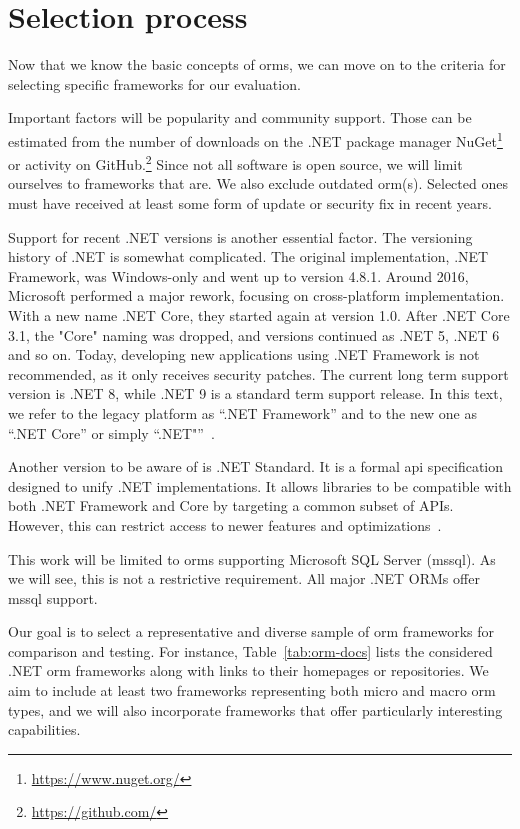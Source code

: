 \section{Selection process}
Now that we know the basic concepts of \acrshort{orm}s, we can move on to the criteria for selecting specific frameworks for our evaluation.

Important factors will be popularity and community support. Those can be estimated from the number of downloads on the .NET package manager NuGet\footnote{\url{https://www.nuget.org/}} or activity on GitHub.\footnote{\url{https://github.com/}} Since not all software is open source, we will limit ourselves to frameworks that are. We also  exclude outdated \acrshort{orm}(s). Selected ones must have received at least some form of update or security fix in recent years.

Support for recent .NET versions is another essential factor. The versioning history of .NET is somewhat complicated. The original implementation, .NET Framework, was Windows-only and went up to version 4.8.1. Around 2016, Microsoft performed a major rework, focusing on cross-platform implementation. With a new name .NET Core, they started again at version 1.0. After .NET Core 3.1, the "Core" naming was dropped, and versions continued as .NET 5, .NET 6 and so on. Today, developing new applications using .NET Framework is not recommended, as it only receives security patches. The current long term support version is .NET 8, while .NET 9 is a standard term support release. In this text, we refer to the legacy platform as ``.NET Framework'' and to the new one as ``.NET Core'' or simply ``.NET"''~\cite{NETFrameworkVersions,NETversions}.

Another version to be aware of is .NET Standard. It is a formal \acrshort{api} specification designed to unify .NET implementations. It allows libraries to be compatible with both .NET Framework and Core by targeting a common subset of APIs. However, this can restrict access to newer features and optimizations~\cite{NETStandard}.

This work will be limited to \acrshort{orm}s supporting Microsoft SQL Server (\acrshort{mssql}). As we will see, this is not a restrictive requirement. All major .NET ORMs offer \acrshort{mssql} support.

Our goal is to select a representative and diverse sample of \acrshort{orm} frameworks for comparison and testing. For instance, Table~\ref{tab:orm-docs} lists the considered .NET \acrshort{orm} frameworks along with links to their homepages or repositories. We aim to include at least two frameworks representing both micro and macro \acrshort{orm} types, and we will also incorporate frameworks that offer particularly interesting capabilities.

